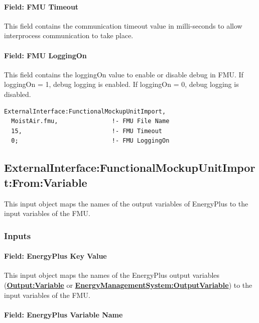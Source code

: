 \paragraph{Field: FMU Timeout}\label{field-fmu-timeout}

This field contains the communication timeout value in milli-seconds to allow interprocess communication to take place.

\paragraph{Field: FMU LoggingOn}\label{field-fmu-loggingon}

This field contains the loggingOn value to enable or disable debug in FMU. If loggingOn = 1, debug logging is enabled. If loggingOn = 0, debug logging is disabled.

\begin{lstlisting}
ExternalInterface:FunctionalMockupUnitImport,
  MoistAir.fmu,               !- FMU File Name
  15,                         !- FMU Timeout
  0;                          !- FMU LoggingOn
\end{lstlisting}

\subsection{ExternalInterface:FunctionalMockupUnitImport:From:Variable}\label{externalinterfacefunctionalmockupunitimportfromvariable}

This input object maps the names of the output variables of EnergyPlus to the input variables of the FMU.

\subsubsection{Inputs}\label{inputs-5-010}

\paragraph{Field: EnergyPlus Key Value}\label{field-energyplus-key-value}

This input object maps the names of the EnergyPlus output variables (\textbf{\hyperref[outputvariable]{Output:Variable}} or \textbf{\hyperref[energymanagementsystemoutputvariable]{EnergyManagementSystem:OutputVariable}}) to the input variables of the FMU.

\paragraph{Field: EnergyPlus Variable Name}\label{field-energyplus-variable-name}

